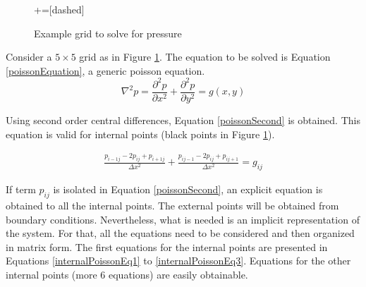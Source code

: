 \documentclass[journal]{IEEEtran}
\begin{document}
\begin{figure}[!ht]
\centering
{}+=[dashed]%
\caption{Example grid to solve for pressure\label{examplePressureGrid}}
\end{figure}

Consider a $5\times 5$ grid as in Figure \ref{examplePressureGrid}. The equation to be solved is Equation \ref{poissonEquation}, a generic poisson equation. 
\begin{equation}
\nabla^2 p = \frac{\partial^2 p}{\partial x^2} + \frac{\partial^2 p}{\partial y^2} = g(x,y)\label{poissonEquation}
\end{equation}

Using second order central differences, Equation \ref{poissonSecond} is obtained. This equation is valid for internal points (black points in Figure \ref{examplePressureGrid}).

\begin{eqnarray}
\frac{p_{i-1j} - 2p_{ij} + p_{i+1j}}{\Delta x^2}	+ \frac{p_{ij-1} - 2p_{ij} + p_{ij+1}}{\Delta x^2} = g_{ij}\label{poissonSecond}
\end{eqnarray}

If term $p_{ij}$ is isolated in Equation \ref{poissonSecond}, an explicit equation is obtained to all the internal points. The external points will be obtained from boundary conditions. Nevertheless, what is needed is an implicit representation of the system. For that, all the equations need to be considered and then organized in matrix form. The first equations for the internal points are presented in Equations \ref{internalPoissonEq1} to \ref{internalPoissonEq3}. Equations for the other internal points (more 6 equations) are easily obtainable.
\end{document}

